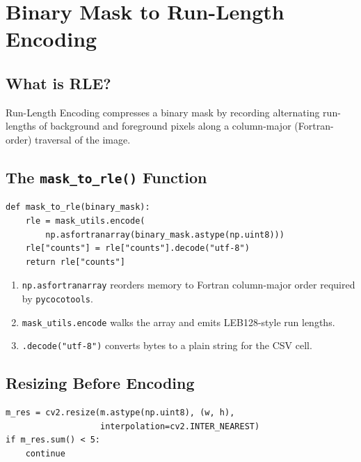 \documentclass[11pt,a4paper,openany]{report}
\begin{document}
\chapter{Binary Mask to Run-Length Encoding}

\section{What is RLE?}

Run-Length Encoding compresses a binary mask by recording alternating run-lengths of
background and foreground pixels along a column-major (Fortran-order) traversal of the image.

\section{The \texttt{mask\_to\_rle()} Function}

\begin{lstlisting}[caption={RLE encoding via pycocotools},label={lst:rle_enc}]
def mask_to_rle(binary_mask):
    rle = mask_utils.encode(
        np.asfortranarray(binary_mask.astype(np.uint8)))
    rle["counts"] = rle["counts"].decode("utf-8")
    return rle["counts"]
\end{lstlisting}

\begin{enumerate}
  \item \texttt{np.asfortranarray} reorders memory to Fortran column-major order required by
        \texttt{pycocotools}.
  \item \texttt{mask\_utils.encode} walks the array and emits LEB128-style run lengths.
  \item \texttt{.decode("utf-8")} converts bytes to a plain string for the CSV cell.
\end{enumerate}

\section{Resizing Before Encoding}

\begin{lstlisting}[caption={Mask resize and trivial-fragment filtering},label={lst:resize}]
m_res = cv2.resize(m.astype(np.uint8), (w, h),
                   interpolation=cv2.INTER_NEAREST)
if m_res.sum() < 5:
    continue
\end{lstlisting}
\end{document}
